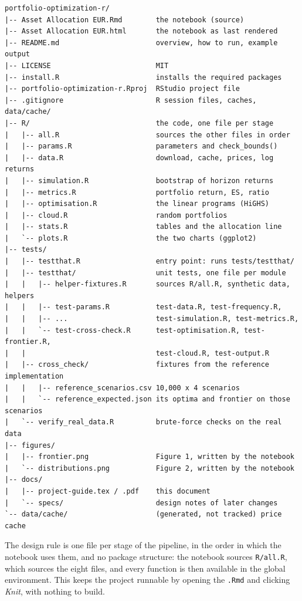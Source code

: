 \documentclass[11pt,a4paper]{article}
\newcommand{\file}[1]{\texttt{#1}}
\theoremstyle{plain}
\theoremstyle{remark}
\begin{document}
\begin{verbatim}
portfolio-optimization-r/
|-- Asset Allocation EUR.Rmd        the notebook (source)
|-- Asset Allocation EUR.html       the notebook as last rendered
|-- README.md                       overview, how to run, example output
|-- LICENSE                         MIT
|-- install.R                       installs the required packages
|-- portfolio-optimization-r.Rproj  RStudio project file
|-- .gitignore                      R session files, caches, data/cache/
|-- R/                              the code, one file per stage
|   |-- all.R                       sources the other files in order
|   |-- params.R                    parameters and check_bounds()
|   |-- data.R                      download, cache, prices, log returns
|   |-- simulation.R                bootstrap of horizon returns
|   |-- metrics.R                   portfolio return, ES, ratio
|   |-- optimisation.R              the linear programs (HiGHS)
|   |-- cloud.R                     random portfolios
|   |-- stats.R                     tables and the allocation line
|   `-- plots.R                     the two charts (ggplot2)
|-- tests/
|   |-- testthat.R                  entry point: runs tests/testthat/
|   |-- testthat/                   unit tests, one file per module
|   |   |-- helper-fixtures.R       sources R/all.R, synthetic data, helpers
|   |   |-- test-params.R           test-data.R, test-frequency.R,
|   |   |-- ...                     test-simulation.R, test-metrics.R,
|   |   `-- test-cross-check.R      test-optimisation.R, test-frontier.R,
|   |                               test-cloud.R, test-output.R
|   |-- cross_check/                fixtures from the reference implementation
|   |   |-- reference_scenarios.csv 10,000 x 4 scenarios
|   |   `-- reference_expected.json its optima and frontier on those scenarios
|   `-- verify_real_data.R          brute-force checks on the real data
|-- figures/
|   |-- frontier.png                Figure 1, written by the notebook
|   `-- distributions.png           Figure 2, written by the notebook
|-- docs/
|   |-- project-guide.tex / .pdf    this document
|   `-- specs/                      design notes of later changes
`-- data/cache/                     (generated, not tracked) price cache
\end{verbatim}

The design rule is one file per stage of the pipeline, in the order in
which the notebook uses them, and no package structure: the notebook sources
\file{R/all.R}, which sources the eight files, and every function is then
available in the global environment. This keeps the project runnable by
opening the \file{.Rmd} and clicking \emph{Knit}, with nothing to build.
\end{document}
